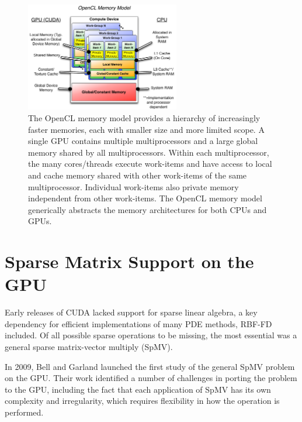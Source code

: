 \documentclass{report}
\begin{document}
\begin{figure}
\centering
\includegraphics[width=0.6\textwidth]{../figures/prospectus/opencl_memory_model.pdf}
\caption{The OpenCL memory model provides a hierarchy of increasingly faster memories, each with smaller size and more limited scope. A single GPU contains multiple multiprocessors and a large global memory shared by all multiprocessors. Within each multiprocessor, the many cores/threads execute work-items and have access to local and cache memory shared with other work-items of the same multiprocessor. Individual work-items also private memory independent from other work-items. The OpenCL memory model generically abstracts the memory architectures for both CPUs and GPUs.} 
\label{fig:opencl_memory_model}
\end{figure}

\section{Sparse Matrix Support on the GPU}


Early releases of CUDA lacked support for sparse linear algebra, a key dependency for efficient implementations of many PDE methods, RBF-FD included. Of all possible sparse operations to be missing, the most essential was a general sparse matrix-vector multiply (SpMV). 

In 2009, Bell and Garland \cite{Bell2009} launched the first study of the general SpMV problem on the GPU. Their work identified a number of challenges in porting the problem to the GPU, including the fact that each application of SpMV has its own complexity and irregularity, which requires flexibility in how the operation is performed. 
\end{document}
